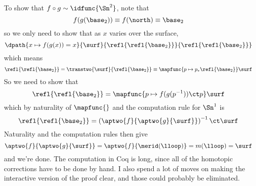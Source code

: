 To show that $f \circ g \sim \idfunc{\Sn^{2}}$, note that
\[
  f(g(\base_{2})) \equiv f(\north) \equiv \base_{2}
\]
so we only need to show that as $x$ varies over the surface,
\[
  \dpath{x \mapsto f(g(x)) =
  x}{\surf}{\refl{\refl{\base_{2}}}}{\refl{\refl{\base_{2}}}}
\]
which means
\[
 \refl{\refl{\base_{2}}} = \transtwo{\surf}{\refl{\base_{2}}}
  \equiv
  \mapfunc{p \mapsto p_{*} \refl{\base_{2}}}\surf
\]
So we need to show that
\[
  \refl{\refl{\base_{2}}} = \mapfunc{p \mapsto f(g(p^{-1})) \ct p} \surf
\]
which by naturality of $\mapfunc{}$ and the computation rule for $\Sn^{1}$ is
\[
  \refl{\refl{\base_{2}}} 
  =
  \left(\aptwo{f}{\aptwo{g}{\surf}}\right)^{-1}
  \ct
  \surf
\]
Naturality and the computation rules then give
\[
  \aptwo{f}{\aptwo{g}{\surf}} 
  = \aptwo{f}{\merid(\lloop)} 
  = m(\lloop)
  = \surf
\]
and we're done.  The computation in Coq is long, since all of the homotopic
corrections have to be done by hand.  I also spend a lot of moves on making the
interactive version of the proof clear, and those could probably be eliminated.
